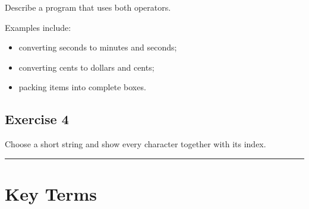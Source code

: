 \documentclass[
]{article}
\providecommand{\tightlist}{%
  \setlength{\itemsep}{0pt}\setlength{\parskip}{0pt}}
\begin{document}
Describe a program that uses both operators.

Examples include:

\begin{itemize}
\tightlist
\item
  converting seconds to minutes and seconds;
\item
  converting cents to dollars and cents;
\item
  packing items into complete boxes.
\end{itemize}

\subsection{Exercise 4}\label{exercise-4}

Choose a short string and show every character together with its index.

\begin{center}\rule{0.5\linewidth}{0.5pt}\end{center}

\section{Key Terms}\label{key-terms}
\end{document}
